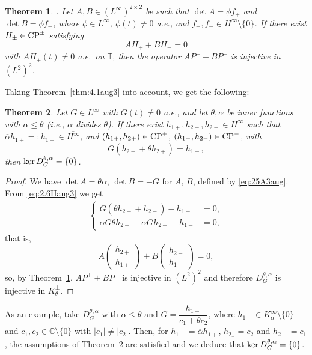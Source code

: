 \documentclass[11pt]{article}
\newtheorem{thm}{Theorem}[section]
\def\CC{\mathbb C}
\def\TT{\mathbb T}
\def\beginpf{\begin{proof}}
\def\endpf{\end{proof}}
\def\beq{\begin{equation}}
\def\eeq{\end{equation}}
\def\ol{\overline}
\def\ker{\mathop{\rm ker}\nolimits}
\def\CP{{\rm CP}}
\begin{document}
  \begin{thm}\label{thm:4.1Haug3}
  \cite[Thm.~8.1]{CKLP}. Let $A,B \in (L^\infty)^{2 \times 2}$ be such that
  $\det A=\phi f_+$ and $\det B=\phi f_-$, where $\phi \in L^\infty$, $\phi(t) \ne 0$ a.e., and
  $f_+, \ol{f_-} \in H^\infty \setminus \{0\}$. If there exist $H_\pm \in \CP^\pm$ satisfying
  \[
  AH_+ + B H_- =0
  \]
  with $AH_+(t) \ne 0$ a.e.\ on $\TT$, then the operator $AP^++BP^-$
  is injective in $(L^2)^2$.
  \end{thm}
  Taking Theorem~\ref{thm:4.1aug3} into account, we get the following:
  
  \begin{thm}\cite[Thm.~8.3]{CKLP} \label{thm:4.1Iaug3}
  Let $G \in L^\infty$ with $G(t)\ne 0$ a.e., and
  let $\theta,\alpha$ be inner functions with $\alpha \le \theta$ (i.e., $\alpha$ divides $\theta$).
  If there exist $h_{1+},h_{2+},\ol{h_{2-}} \in H^\infty$ such that
  $\ol\alpha h_{1+}=: h_{1-} \in \ol{H^\infty}$, and
  $(h_{1+},h_{2+}) \in \CP^+$, $(h_{1-},h_{2-}) \in \CP^-$, with
  \beq\label{eq:2.6Haug3}
  G(h_{2-}+\theta h_{2+})=h_{1+},
  \eeq
  then $\ker D_G^{\theta,\alpha}=\{0\}$.
  \end{thm}
  \beginpf
  We have $\det A=\theta\ol\alpha$, $\det B=-G$ for $A$, $B$, defined by 
  \eqref{eq:25A3aug}.  From \eqref{eq:2.6Haug3} we get
  \begin{align*}
  \begin{cases}
    G (\theta h_{2+} + h_{2-}) - h_{1+}&=0,\\
    \ol\alpha G \theta h_{2+} + \ol\alpha Gh_{2-} -h_{1-}&=0,
  \end{cases}
\end{align*}
that is, 
\[
A \begin{pmatrix} h_{2+} \\ h_{1+} \end{pmatrix} + B \begin{pmatrix} h_{2-} \\ h_{1-}
\end{pmatrix} =0,
\]
so, by Theorem~\ref{thm:4.1Haug3}, $AP^+ + BP^-$ is injective in $(L^2)^2$ and therefore
$D^{\theta,\alpha}_G$ is injective in $K^\perp_\theta$.  
  \endpf
  
  As an example, take $D^{\theta,\alpha}_G$ with $\alpha \le \theta$ and $G=\dfrac{h_{1+}}{c_1+\theta c_2}$, where
  $h_{1+} \in K_\alpha^\infty \setminus \{0\}$ and $c_1,c_2 \in \CC\setminus\{0\}$ with
  $|c_1| \ne |c_2|$. Then,
  for $h_{1-}=\ol\alpha h_{1+}$, $h_{2_+}=c_2$ and $h_{2-}=c_1$, the assumptions of Theorem~\ref{thm:4.1Iaug3} are satisfied and we deduce that
  $\ker D_G^{\theta,\alpha}=\{0\}$.\\
  
\end{document}

